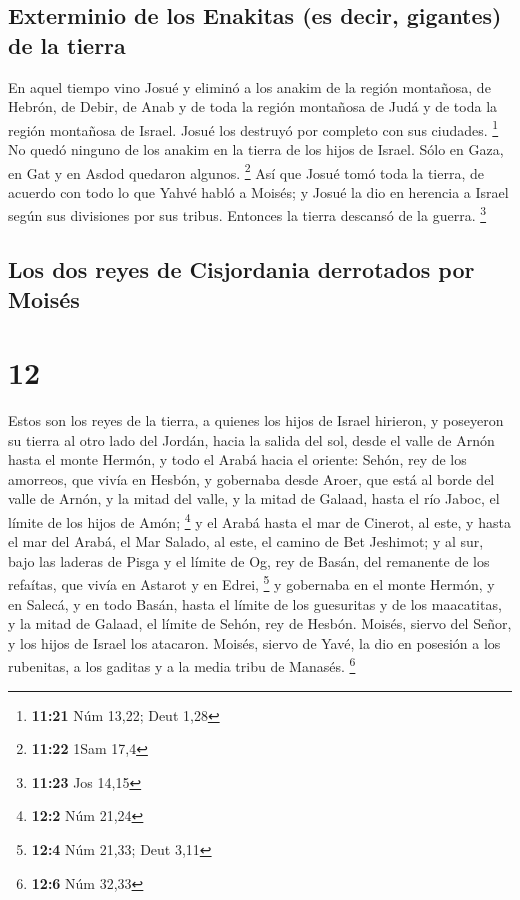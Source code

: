 \hypertarget{exterminio-de-los-enakitas-es-decir-gigantes-de-la-tierra}{%
\subsection{Exterminio de los Enakitas (es decir, gigantes) de la
tierra}\label{exterminio-de-los-enakitas-es-decir-gigantes-de-la-tierra}}

 En aquel tiempo vino Josué y eliminó a los anakim de la
región montañosa, de Hebrón, de Debir, de Anab y de toda la región
montañosa de Judá y de toda la región montañosa de Israel. Josué los
destruyó por completo con sus ciudades. \footnote{\textbf{11:21} Núm
  13,22; Deut 1,28}  No quedó ninguno de los anakim en la
tierra de los hijos de Israel. Sólo en Gaza, en Gat y en Asdod quedaron
algunos. \footnote{\textbf{11:22} 1Sam 17,4}  Así que
Josué tomó toda la tierra, de acuerdo con todo lo que Yahvé habló a
Moisés; y Josué la dio en herencia a Israel según sus divisiones por sus
tribus. Entonces la tierra descansó de la guerra. \footnote{\textbf{11:23}
  Jos 14,15}

\hypertarget{los-dos-reyes-de-cisjordania-derrotados-por-moisuxe9s}{%
\subsection{Los dos reyes de Cisjordania derrotados por
Moisés}\label{los-dos-reyes-de-cisjordania-derrotados-por-moisuxe9s}}

\hypertarget{section-11}{%
\section{12}\label{section-11}}

 Estos son los reyes de la tierra, a quienes los hijos de
Israel hirieron, y poseyeron su tierra al otro lado del Jordán, hacia la
salida del sol, desde el valle de Arnón hasta el monte Hermón, y todo el
Arabá hacia el oriente:  Sehón, rey de los amorreos, que
vivía en Hesbón, y gobernaba desde Aroer, que está al borde del valle de
Arnón, y la mitad del valle, y la mitad de Galaad, hasta el río Jaboc,
el límite de los hijos de Amón; \footnote{\textbf{12:2} Núm 21,24}
 y el Arabá hasta el mar de Cinerot, al este, y hasta el
mar del Arabá, el Mar Salado, al este, el camino de Bet Jeshimot; y al
sur, bajo las laderas de Pisga  y el límite de Og, rey de
Basán, del remanente de los refaítas, que vivía en Astarot y en Edrei,
\footnote{\textbf{12:4} Núm 21,33; Deut 3,11}  y gobernaba
en el monte Hermón, y en Salecá, y en todo Basán, hasta el límite de los
guesuritas y de los maacatitas, y la mitad de Galaad, el límite de
Sehón, rey de Hesbón.  Moisés, siervo del Señor, y los
hijos de Israel los atacaron. Moisés, siervo de Yavé, la dio en posesión
a los rubenitas, a los gaditas y a la media tribu de Manasés.
\footnote{\textbf{12:6} Núm 32,33}

